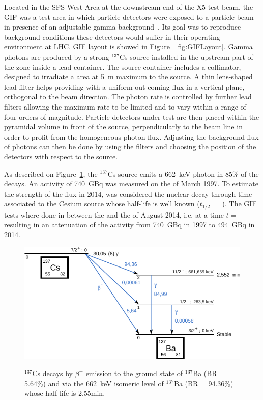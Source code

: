 	Located in the SPS West Area at the downstream end of the X5 test beam, the \acf{GIF} was a test area in which particle detectors were exposed to a particle beam in presence of an adjustable gamma background~\cite{AGOSTEO1999}. Its goal was to reproduce background conditions these detectors would suffer in their operating environment at LHC. GIF layout is showed in Figure ~\ref{fig:GIFLayout}. Gamma photons are produced by a strong $^{137}$Cs source installed in the upstream part of the zone inside a lead container. The source container includes a collimator, designed to irradiate a  area at \SI{5}{m} maximum to the source. A thin lens-shaped lead filter helps providing with a uniform out-coming flux in a vertical plane, orthogonal to the beam direction. The photon rate is controlled by further lead filters allowing the maximum rate to be limited and to vary within a range of four orders of magnitude. Particle detectors under test are then placed within the pyramidal volume in front of the source, perpendicularly to the beam line in order to profit from the homogeneous photon flux. Adjusting the background flux of photons can then be done by using the filters and choosing the position of the detectors with respect to the source.
			
	As described on Figure~\ref{fig:CsSource}, the $^{137}$Cs source emits a \SI{662}{keV} photon in 85\% of the decays. An activity of \SI{740}{GBq} was measured on the  of March 1997. To estimate the strength of the flux in 2014, was considered the nuclear decay through time associated to the Cesium source whose half-life is well known ($t_{1/2}=$ ). The GIF tests where done in between the  and the  of August 2014, i.e. at a time $t=$  resulting in an attenuation of the activity from \SI{740}{GBq} in 1997 to \SI{494}{GBq} in 2014.

	\begin{figure}[H]
		\centering
		\includegraphics[width = \plotwidth]{fig/chapt5/Cs137.pdf}\\
		\caption{\label{fig:CsSource} $^{137}$Cs decays by $\beta^-$ emission to the ground state of $^{137}$Ba (BR = 5.64\%) and via the \SI{662}{keV} isomeric level of $^{137}$Ba (BR = 94.36\%) whose half-life is 2.55min.}
	\end{figure}
		
